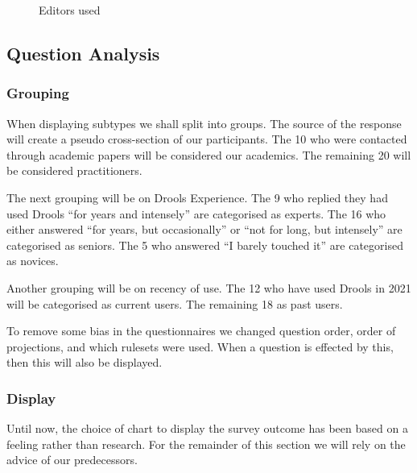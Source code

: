 \begin{figure}[h]
    \centering
    \caption{Editors used}
    \label{fig:editorUsage}
\end{figure}


\subsection{Question Analysis}

\subsubsection{Grouping}
When displaying subtypes we shall split into groups.
The source of the response will create a pseudo cross-section of our participants.
The 10 who were contacted through academic papers will be considered our academics.
The remaining 20 will be considered practitioners.

The next grouping will be on Drools Experience.
The 9 who replied they had used Drools ``for years and intensely'' are categorised as experts.
The 16 who either answered ``for years, but occasionally'' or ``not for long, but intensely'' are categorised as seniors.
The 5 who answered ``I barely touched it'' are categorised as novices.

Another grouping will be on recency of use.
The 12 who have used Drools in 2021 will be categorised as current users.
The remaining 18 as past users.

To remove some bias in the questionnaires we changed question order, order of projections, and which rulesets were used.
When a question is effected by this, then this will also be displayed.

\subsubsection{Display}
Until now, the choice of chart to display the survey outcome has been based on a feeling rather than research. 
For the remainder of this section we will rely on the advice of our predecessors.

